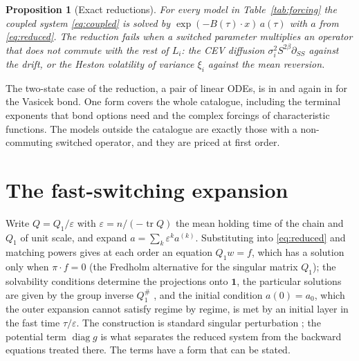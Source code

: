 \documentclass[11pt]{article}
\newtheorem{proposition}[theorem]{Proposition}
\theoremstyle{remark}
\newcommand{\eps}{\varepsilon}
\newcommand{\diag}{\operatorname{diag}}
\begin{document}
\begin{proposition}[Exact reductions]
For every model in Table~\ref{tab:forcing} the coupled system \eqref{eq:coupled} is solved by
$\exp(-B(\tau)\cdot x)\,a(\tau)$ with $a$ from \eqref{eq:reduced}. The reduction fails when a switched parameter
multiplies an operator that does not commute with the rest of $L_i$: the CEV diffusion $\sigma_i^2 S^{2\beta}\partial_{SS}$
against the drift, or the Heston volatility of variance $\xi_i$ against the mean reversion.
\end{proposition}

The two-state case of the reduction, a pair of linear ODEs, is in \citet{cotton2001} and again in \citet{elliott2002} for the Vasicek bond.
One form covers the whole catalogue, including the terminal exponents that bond options need and the complex
forcings of characteristic functions. The models outside the catalogue are exactly those with a non-commuting
switched operator, and they are priced at first order.

\section{The fast-switching expansion}
\label{sec:expansion}

Write $Q = Q_1/\eps$ with $\eps = n/(-\operatorname{tr} Q)$ the mean holding time of the chain and $Q_1$ of unit
scale, and expand $a = \sum_k \eps^k a^{(k)}$. Substituting into \eqref{eq:reduced} and matching powers gives at
each order an equation $Q_1 w = f$, which has a solution only when $\pi\cdot f = 0$ (the Fredholm alternative
for the singular matrix $Q_1$); the solvability conditions determine the projections onto $\mathbf 1$, the
particular solutions are given by the group inverse $Q_1^{\#}$ \citep{meyer1975}, and the initial condition
$a(0) = a_0$, which the outer expansion cannot satisfy regime by regime, is met by an initial layer in the fast
time $\tau/\eps$. The construction is standard singular perturbation \citep{yin2013,nguyen2013}; the potential term $\diag g$ is what
separates the reduced system from the backward equations treated there. The terms have a form that can be stated.
\end{document}
